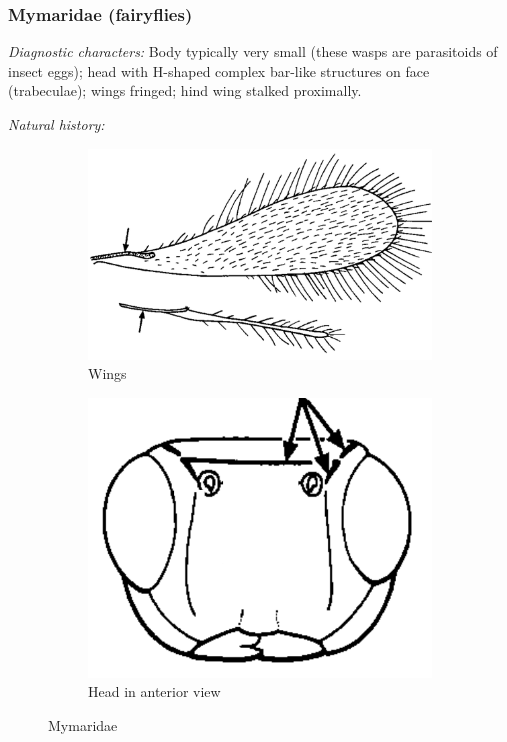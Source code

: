 \documentclass[letterpaper, 11pt]{article}
\begin{document}
\subsubsection{Mymaridae (fairyflies)}
\noindent{}\textit{Diagnostic characters:} Body typically very small (these wasps are parasitoids of insect eggs); head with H-shaped complex bar-like structures on face (trabeculae); wings fringed; hind wing stalked proximally.

\noindent{}\textit{Natural history:} 

\begin{figure}[ht!]
  \centering
\begin{subfigure}[ht!]{0.5\textwidth}
    \includegraphics[width=\textwidth]{MymaridWings}
  \caption{Wings}
  \label{fig:mymarid1}
\end{subfigure}
    \qquad
\begin{subfigure}[ht!]{0.28\textwidth}
    \includegraphics[width=\textwidth]{MymaridHead}
  \caption{Head in anterior view}
  \label{fig:mymarid2}
\end{subfigure}
    \caption{Mymaridae \citep[][pg. 87]{goulet1993hymenoptera}}\label{fig:mymarids}
\end{figure}
\end{document}
